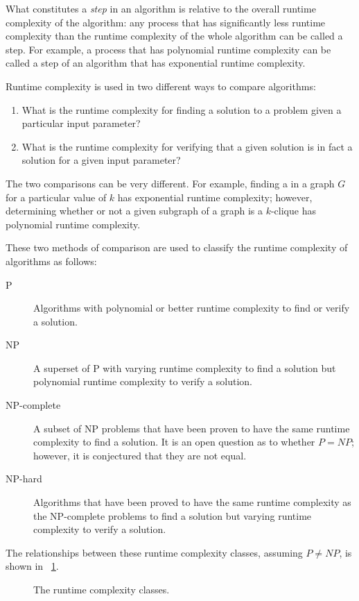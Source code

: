 What constitutes a \emph{step} in an algorithm is relative to the overall runtime complexity of the algorithm: any
process that has significantly less runtime complexity than the runtime complexity of the whole algorithm can be
called a step.  For example, a process that has polynomial runtime complexity can be called a step of an algorithm
that has exponential runtime complexity.

Runtime complexity is used in two different ways to compare algorithms:
\begin{enumerate}
\item What is the runtime complexity for finding a solution to a problem given a particular input parameter?
\item What is the runtime complexity for verifying that a given solution is in fact a solution for a given
  input parameter?
\end{enumerate}

The two comparisons can be very different.  For example, finding a  in a graph \(G\) for a particular value
of \(k\) has exponential runtime complexity; however, determining whether or not a given subgraph of a graph is a
\(k\)-clique has polynomial runtime complexity.

These two methods of comparison are used to classify the runtime complexity of algorithms as follows:
\begin{description}
\item[P] Algorithms with polynomial or better runtime complexity to find or verify a solution.
\item[NP] A superset of P with varying runtime complexity to find a solution but polynomial runtime complexity to
  verify a solution.
\item[NP-complete] A subset of NP problems that have been proven to have the same runtime complexity to find a
  solution.  It is an open question as to whether \(P=NP\); however, it is conjectured that they are not equal.
\item[NP-hard] Algorithms that have been proved to have the same runtime complexity as the NP-complete problems to
  find a solution but varying runtime complexity to verify a solution.
\end{description}

The relationships between these runtime complexity classes, assuming \(P\ne NP\), is shown in
\figurename~\ref{fig:complexity}.

\begin{figure}[H]
  \centering
  \caption{The runtime complexity classes.}
  \label{fig:complexity}
\end{figure}

